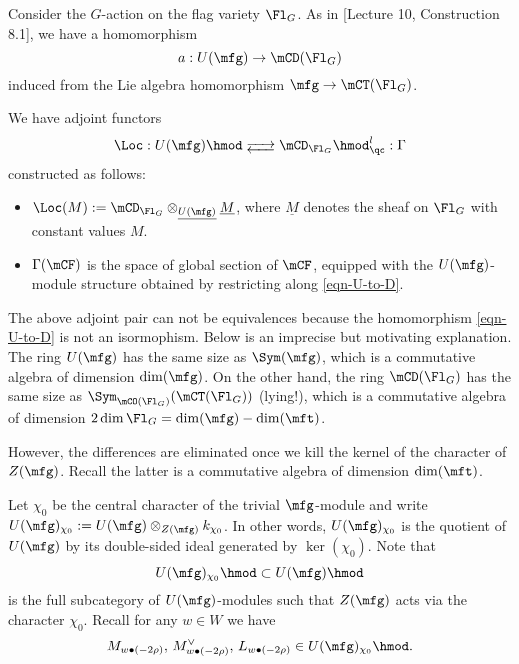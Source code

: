 	Consider the $G$-action on the flag variety $\Fl_G$. As in [Lecture 10, Construction 8.1], we have a homomorphism
	\begin{equation}
		\label{eqn-U-to-D}
		a: U(\mfg) \to \mCD(\Fl_G)
	\end{equation}
	induced from the Lie algebra homomorphism $\mfg \to \mCT(\Fl_G)$.

	\begin{constr}
		We have adjoint functors
		\begin{equation}
			\label{eqn-loc-gamma}
			\Loc: U(\mfg)\hmod \adj \mCD_{\Fl_G}\hmod_\qc^l : \Gamma
		\end{equation}
		constructed as follows:
		\begin{itemize}
			\item 
				$\Loc(M):=  \mCD_{\Fl_G}\ot_{\underline{U(\mfg)}} \underline{M}$, where $\underline{M}$ denotes the sheaf on $\Fl_G$ with constant values $M$.
			\item
				$\Gamma(\mCF)$ is the space of global section of $\mCF$, equipped with the $U(\mfg)$-module structure obtained by restricting along \eqref{eqn-U-to-D}.
		\end{itemize}
	\end{constr}

	\begin{rem}
		The above adjoint pair can not be equivalences because the homomorphism \eqref{eqn-U-to-D} is not an isormophism. Below is an imprecise but motivating explanation. The ring $U(\mfg)$ has the same size as $\Sym(\mfg)$, which is a commutative algebra of dimension $\dim(\mfg)$. On the other hand, the ring $\mCD(\Fl_G)$ has the same size as $\Sym_{\mCO(\Fl_G)}(\mCT(\Fl_G))$ (lying!), which is a commutative algebra of dimension $2\dim \Fl_G = \dim(\mfg)-\dim(\mft)$.
	\end{rem}

	However, the differences are eliminated once we kill the kernel of the character of $Z(\mfg)$. Recall the latter is a commutative algebra of dimension $\dim(\mft)$.

	\begin{constr}
		Let $\chi_0$ be the central character of the trivial $\mfg$-module and write $U(\mfg)_{\chi_0}:= U(\mfg) \ot_{Z(\mfg)} k_{\chi_0}$. In other words, $U(\mfg)_{\chi_0}$ is the quotient of $U(\mfg)$ by its double-sided ideal generated by $\ker(\chi_0)$. Note that 
		\[
			U(\mfg)_{\chi_0}\hmod  \subset U(\mfg)\hmod
		\]
		is the full subcategory of $U(\mfg)$-modules such that $Z(\mfg)$ acts via the character $\chi_0$. Recall for any $w\in W$ we have
		\[
			M_{w\bullet (-2\rho)}, \,M_{w\bullet (-2\rho)}^\vee, \,L_{w\bullet (-2\rho)} \in U(\mfg)_{\chi_0}\hmod.
		\]
	\end{constr}

